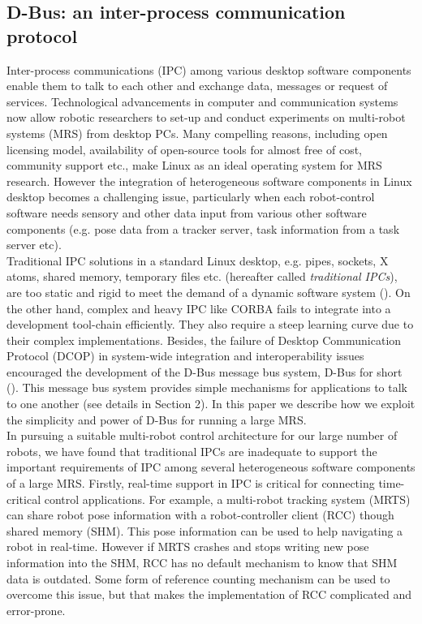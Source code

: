 \subsection{D-Bus: an inter-process communication protocol}
\label{expt-tools:dbus}
Inter-process communications (IPC) among various desktop software components enable them to talk to each other and exchange data, messages or request of services. Technological advancements in computer and communication systems now allow robotic researchers to set-up and conduct experiments on multi-robot systems (MRS) from desktop PCs. Many compelling reasons, including open licensing model, availability of open-source tools for almost free of cost, community support etc., make Linux as an ideal operating system for MRS research. However the integration of heterogeneous software components in Linux desktop becomes a challenging issue, particularly when each robot-control software needs sensory and other data input from various other software components (e.g. pose data from a tracker server, task information from a task server etc).\\ 
Traditional IPC solutions in a standard Linux desktop, e.g. pipes, sockets, X atoms, shared memory, temporary files etc. (hereafter called {\em traditional IPCs}), are too static and rigid to meet the demand of a dynamic software system (\cite{wittenburg2005}). On the other hand, complex and heavy IPC like CORBA fails to integrate into a development tool-chain efficiently. They also require a steep learning curve due to their complex implementations. Besides, the failure of Desktop Communication Protocol (DCOP) in system-wide integration and interoperability issues encouraged the development of the D-Bus message bus system, D-Bus for short (\cite{Pennington+2010}). This message bus system provides simple mechanisms for applications to talk to one another (see details in Section 2). In this paper we describe  how we exploit the simplicity and power of D-Bus  for running a large MRS.\\
In pursuing a suitable multi-robot control architecture for our large number of robots, we have found that traditional IPCs are inadequate to support the important requirements of IPC among several heterogeneous software components of a large MRS. Firstly, real-time support in IPC is critical for connecting time-critical control applications. For example, a multi-robot tracking system (MRTS) can share robot pose information with a robot-controller client (RCC) though shared memory (SHM). This pose information can be used to help navigating a robot in real-time. However if MRTS crashes and stops writing new pose information into the SHM, RCC has no default mechanism to know that SHM data is outdated. Some form of reference counting mechanism can be used to overcome this issue, but that makes the implementation of RCC complicated and error-prone.\\
